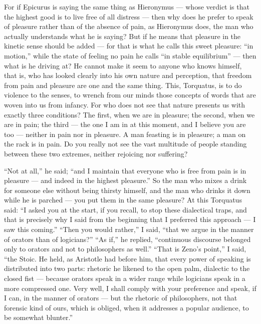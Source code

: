 For if Epicurus is saying the same thing as Hieronymus — whose verdict is that the highest good is to live free of all distress — then why does he prefer to speak of pleasure rather than of the absence of pain, as Hieronymus does, the man who actually understands what he is saying? But if he means that pleasure in the kinetic sense should be added — for that is what he calls this sweet pleasure: ``in motion,'' while the state of feeling no pain he calls ``in stable equilibrium'' — then what is he driving at? He cannot make it seem to anyone who knows himself, that is, who has looked clearly into his own nature and perception, that freedom from pain and pleasure are one and the same thing. This, Torquatus, is to do violence to the senses, to wrench from our minds those concepts of words that are woven into us from infancy. For who does not see that nature presents us with exactly three conditions? The first, when we are in pleasure; the second, when we are in pain; the third — the one I am in at this moment, and I believe you are too — neither in pain nor in pleasure. A man feasting is in pleasure; a man on the rack is in pain. Do you really not see the vast multitude of people standing between these two extremes, neither rejoicing nor suffering?

``Not at all,'' he said; ``and I maintain that everyone who is free from pain is in pleasure — and indeed in the highest pleasure.'' So the man who mixes a drink for someone else without being thirsty himself, and the man who drinks it down while he is parched — you put them in the same pleasure? At this Torquatus said: ``I asked you at the start, if you recall, to stop these dialectical traps, and that is precisely why I said from the beginning that I preferred this approach — I saw this coming.'' ``Then you would rather,'' I said, ``that we argue in the manner of orators than of logicians?'' ``As if,'' he replied, ``continuous discourse belonged only to orators and not to philosophers as well.'' ``That is Zeno's point,'' I said, ``the Stoic. He held, as Aristotle had before him, that every power of speaking is distributed into two parts: rhetoric he likened to the open palm, dialectic to the closed fist — because orators speak in a wider range while logicians speak in a more compressed one. Very well, I shall comply with your preference and speak, if I can, in the manner of orators — but the rhetoric of philosophers, not that forensic kind of ours, which is obliged, when it addresses a popular audience, to be somewhat blunter.''

